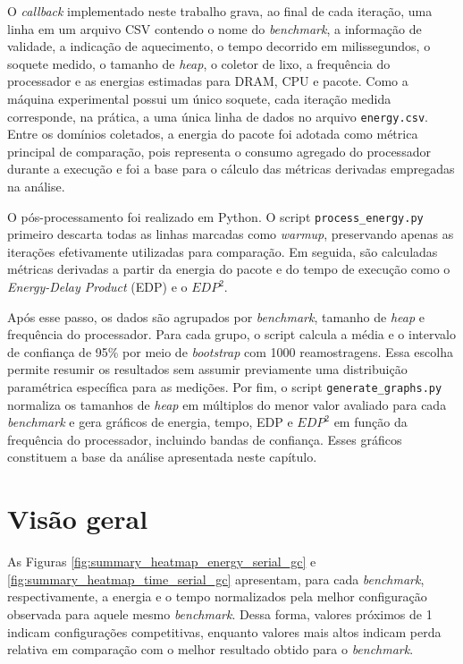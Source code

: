 O \textit{callback} implementado neste trabalho grava, ao final de cada
iteração, uma linha em um arquivo CSV contendo o nome do \textit{benchmark}, a
informação de validade, a indicação de aquecimento, o tempo decorrido em
milissegundos, o soquete medido, o tamanho de \textit{heap}, o coletor de
lixo, a frequência do processador e as energias estimadas para DRAM, CPU e
pacote. Como a máquina experimental possui um único soquete, cada iteração
medida corresponde, na prática, a uma única linha de dados no arquivo
\texttt{energy.csv}. Entre os domínios coletados, a energia do pacote foi
adotada como métrica principal de comparação, pois representa o consumo
agregado do processador durante a execução e foi a base para o cálculo das
métricas derivadas empregadas na análise.

O pós-processamento foi realizado em Python. O script
\texttt{process\_energy.py} primeiro descarta todas as linhas marcadas como
\textit{warmup}, preservando apenas as iterações efetivamente utilizadas para
comparação. Em seguida, são calculadas métricas derivadas a partir da energia
do pacote e do tempo de execução como o \textit{Energy-Delay Product} (EDP) e 
o \(EDP^2\).

Após esse passo, os dados são agrupados por \textit{benchmark}, tamanho de
\textit{heap} e frequência do processador. Para cada grupo, o script calcula a
média e o intervalo de confiança de 95\% por meio de \textit{bootstrap} com
1000 reamostragens. Essa escolha permite resumir os resultados sem assumir
previamente uma distribuição paramétrica específica para as medições. Por fim,
o script \texttt{generate\_graphs.py} normaliza os tamanhos de \textit{heap}
em múltiplos do menor valor avaliado para cada \textit{benchmark} e gera
gráficos de energia, tempo, EDP e \(EDP^2\) em função da frequência do
processador, incluindo bandas de confiança. Esses gráficos constituem a base da
análise apresentada neste capítulo.

\section{Visão geral}

As Figuras \ref{fig:summary_heatmap_energy_serial_gc} e
\ref{fig:summary_heatmap_time_serial_gc} apresentam, para cada
\textit{benchmark}, respectivamente, a energia e o tempo normalizados pela
melhor configuração observada para aquele mesmo \textit{benchmark}. Dessa
forma, valores próximos de 1 indicam configurações competitivas, enquanto
valores mais altos indicam perda relativa em comparação com o melhor
resultado obtido para o \textit{benchmark}.

